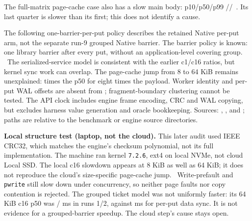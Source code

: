 The full-matrix page-cache case also has a slow main body: p10/p50/p99 //~\us. Its last quarter is slower than its first; this does not identify a cause.

The following one-barrier-per-put policy describes the retained Native per-put arm, not the separate run-9 grouped Native barrier.
The barrier policy is known: one library barrier after every put, without an application-level covering group. \inference\ The serialized-service model is consistent with the earlier c1/c16 ratios, but kernel sync work can overlap. The page-cache jump from 8 to 64 KiB remains unexplained:  times the p50 for eight times the payload. Worker identity and per-put WAL offsets are absent from ; fragment-boundary clustering cannot be tested. The API clock includes engine frame encoding, CRC and WAL copying, but excludes harness value generation and oracle bookkeeping. Sources: , ,  and ; paths are relative to the benchmark or engine source directories.

\clearpage
\textbf{Local structure test (laptop, not the cloud).} This later audit used IEEE CRC32, which matches the engine's checksum polynomial, not its full implementation. The machine ran kernel \texttt{7.2.6}, ext4 on local NVMe, not cloud Local SSD. The local c16 slowdown appears at 8 KiB as well as 64 KiB; it does not reproduce the cloud's size-specific page-cache jump. \inference\ Write-prefault and \texttt{pwrite} still slow down under concurrency, so neither page faults nor copy contention is rejected. The grouped ticket model was not uniformly faster: its 64 KiB c16 p50 was / ms in runs 1/2, against  ms for per-put data sync. It is not evidence for a grouped-barrier speedup. The cloud step's cause stays open.

